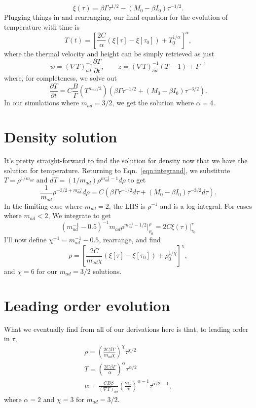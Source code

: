 \documentclass[onecolumn, amsmath, amsfonts, amssymb]{aastex62}
\newcommand{\grad}{\ensuremath{\nabla}}
\begin{document}
$$
\xi(\tau) = \beta\Gamma \tau^{1/2} - (M_0 - \beta I_0)\tau^{-1/2}.
$$
Plugging things in and rearranging, our final equation for the evolution of temperature with time
is
\begin{equation}
T(t) = \left[\frac{2C}{\alpha}(\xi[\tau] - \xi[\tau_0])
+ T_0^{1/\alpha}\right]^{\alpha},
\end{equation}
where the thermal velocity and height can be simply retrieved as just
\begin{equation}
w = (\grad T)_{ad}^{-1}\frac{\partial T}{\partial t}, \qquad z = (\grad T)_{ad}^{-1}(T - 1) + F^{-1}
\end{equation}
where, for completeness, we solve out
\begin{equation}
\frac{\partial T}{\partial t} 
= C \frac{B}{\Gamma}( T^{m_{ad}/2} ) \left(\beta\Gamma\tau^{-1/2} + (M_0 - \beta I_0)\tau^{-3/2}\right)
.
\end{equation}
In our simulations where $m_{ad} = 3/2$, we get the solution where $\alpha = 4$.

\section{Density solution}
It's pretty straight-forward to find the solution for density now that we have the solution
for temperature. Returning to Eqn.~\ref{eqn:integrand}, we substitute $T = \rho^{1/m_{ad}}$ and
$dT = (1/m_{ad})\rho^{m_{ad}^{-1} - 1} d\rho$ to get
\begin{equation}
\frac{1}{m_{ad}}\rho^{-3/2 + m_{ad}^{-1}}d\rho = C\left(\beta \Gamma\tau^{-1/2}d\tau + (M_0 - \beta I_0)\tau^{-3/2}d\tau\right).
\end{equation}
In the limiting case where $m_{ad} = 2$, the LHS is $\rho^{-1}$ and is a log integral. For
cases where $m_{ad} < 2$, We integrate to get
\begin{equation}
(m_{ad}^{-1} - 0.5)^{-1}m_{ad}\rho^{m_{ad}^{-1} - 1/2}\bigg|_{\rho_0}^{\rho} = 2 C \xi(\tau)\bigg|_{\tau_0}^{\tau}
\end{equation}
I'll now define $\chi^{-1} = m_{ad}^{-1} - 0.5$, rearrange, and find
\begin{equation}
\rho = \left[\frac{2 C}{m_{ad}\chi}(\xi[\tau] - \xi[\tau_0]) + \rho_0^{1/\chi}\right]^\chi,
\end{equation}
and $\chi = 6$ for our $m_{ad} = 3/2$ solutions.

\section{Leading order evolution}
What we eventually find from all of our derivations here is that, to leading order in $\tau$,
\begin{gather}
\rho = \left(\frac{2 C\beta\Gamma}{m_{ad}\chi}\right)^{\chi} \tau^{\chi/2} \\
T    = \left(\frac{2 C \beta \Gamma}{\alpha}\right)^{\alpha} \tau^{\alpha/2} \\
w    = \frac{C B \beta}{(\grad T)_{ad}}\left(\frac{2 C}{\alpha}\right)^{\alpha - 1} \tau^{\alpha/2 - 1},
\end{gather}
where $\alpha = 2$ and $\chi = 3$ for $m_{ad} = 3/2$.
\end{document}
